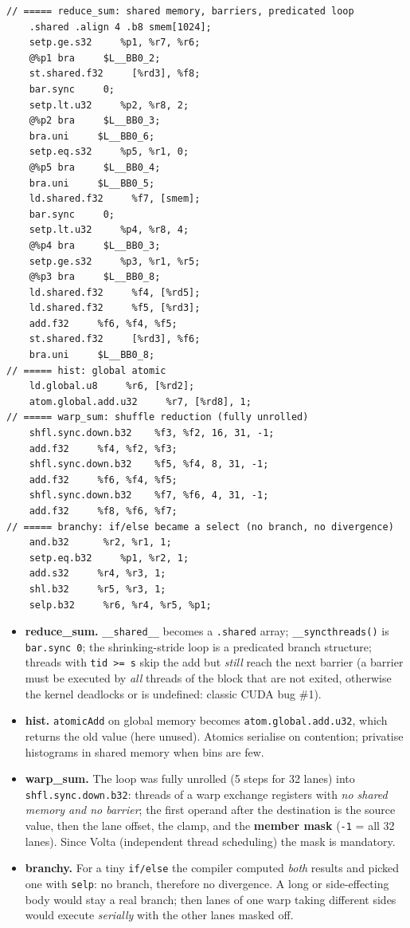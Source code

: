 \documentclass[10pt,a4paper,openany,oneside]{report}
\begin{document}
\begin{lstlisting}[language={PTX},style=out,basicstyle=\ttfamily\scriptsize]
// ===== reduce_sum: shared memory, barriers, predicated loop
    .shared .align 4 .b8 smem[1024];
    setp.ge.s32     %p1, %r7, %r6;
    @%p1 bra     $L__BB0_2;
    st.shared.f32     [%rd3], %f8;
    bar.sync     0;
    setp.lt.u32     %p2, %r8, 2;
    @%p2 bra     $L__BB0_3;
    bra.uni     $L__BB0_6;
    setp.eq.s32     %p5, %r1, 0;
    @%p5 bra     $L__BB0_4;
    bra.uni     $L__BB0_5;
    ld.shared.f32     %f7, [smem];
    bar.sync     0;
    setp.lt.u32     %p4, %r8, 4;
    @%p4 bra     $L__BB0_3;
    setp.ge.s32     %p3, %r1, %r5;
    @%p3 bra     $L__BB0_8;
    ld.shared.f32     %f4, [%rd5];
    ld.shared.f32     %f5, [%rd3];
    add.f32     %f6, %f4, %f5;
    st.shared.f32     [%rd3], %f6;
    bra.uni     $L__BB0_8;
// ===== hist: global atomic
    ld.global.u8     %r6, [%rd2];
    atom.global.add.u32     %r7, [%rd8], 1;
// ===== warp_sum: shuffle reduction (fully unrolled)
    shfl.sync.down.b32    %f3, %f2, 16, 31, -1;
    add.f32     %f4, %f2, %f3;
    shfl.sync.down.b32    %f5, %f4, 8, 31, -1;
    add.f32     %f6, %f4, %f5;
    shfl.sync.down.b32    %f7, %f6, 4, 31, -1;
    add.f32     %f8, %f6, %f7;
// ===== branchy: if/else became a select (no branch, no divergence)
    and.b32      %r2, %r1, 1;
    setp.eq.b32     %p1, %r2, 1;
    add.s32     %r4, %r3, 1;
    shl.b32     %r5, %r3, 1;
    selp.b32     %r6, %r4, %r5, %p1;
\end{lstlisting}
\begin{exbox}
\begin{itemize}[nosep]
\item \textbf{reduce\_sum.} \texttt{\_\_shared\_\_} becomes a \texttt{.shared} array; \texttt{\_\_syncthreads()} is \texttt{bar.sync 0}; the shrinking-stride loop is a predicated branch structure; threads with \texttt{tid >= s} skip the add but \emph{still} reach the next barrier (a barrier must be executed by \emph{all} threads of the block that are not exited, otherwise the kernel deadlocks or is undefined: classic CUDA bug \#1).
\item \textbf{hist.} \texttt{atomicAdd} on global memory becomes \texttt{atom.global.add.u32}, which returns the old value (here unused). Atomics serialise on contention; privatise histograms in shared memory when bins are few.
\item \textbf{warp\_sum.} The loop was fully unrolled (5 steps for 32 lanes) into \texttt{shfl.sync.down.b32}: threads of a warp exchange registers with \emph{no shared memory and no barrier}; the first operand after the destination is the source value, then the lane offset, the clamp, and the \textbf{member mask} (\texttt{-1} = all 32 lanes). Since Volta (independent thread scheduling) the mask is mandatory.
\item \textbf{branchy.} For a tiny \texttt{if/else} the compiler computed \emph{both} results and picked one with \texttt{selp}: no branch, therefore no divergence. A long or side-effecting body would stay a real branch; then lanes of one warp taking different sides would execute \emph{serially} with the other lanes masked off.
\end{itemize}
\end{exbox}
\end{document}
